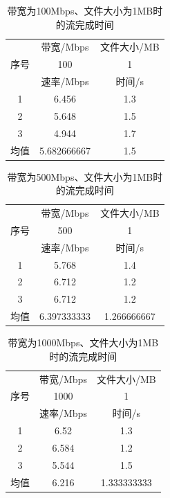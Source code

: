 \documentclass[UTF8]{article}
\begin{document}
\begin{table}[H]
  \centering
  \caption{带宽为100Mbps、文件大小为1MB时的流完成时间}
  \begin{tabular}{|c|c|c|}
    \hline
    \multirow{3}{*}{序号}&带宽/Mbps&文件大小/MB\\
    \cline{2-3}
    &100&1\\
    \cline{2-3}
    &速率/Mbps&时间/s\\
    \hline
    1&6.456&1.3\\
    \hline
    2&5.648&1.5\\
    \hline
    3&4.944&1.7\\
    \hline
    均值&5.682666667&1.5\\
    \hline
  \end{tabular}
\end{table}

\begin{table}[H]
  \centering
  \caption{带宽为500Mbps、文件大小为1MB时的流完成时间}
  \begin{tabular}{|c|c|c|}
    \hline
    \multirow{3}{*}{序号}&带宽/Mbps&文件大小/MB\\
    \cline{2-3}
    &500&1\\
    \cline{2-3}
    &速率/Mbps&时间/s\\
    \hline
    1&5.768&1.4\\
    \hline
    2&6.712&1.2\\
    \hline
    3&6.712&1.2\\
    \hline
    均值&6.397333333&1.266666667\\
    \hline
  \end{tabular}
\end{table}

\begin{table}
  \centering
  \caption{带宽为1000Mbps、文件大小为1MB时的流完成时间}
  \begin{tabular}{|c|c|c|}
    \hline
    \multirow{3}{*}{序号}&带宽/Mbps&文件大小/MB\\
    \cline{2-3}
    &1000&1\\
    \cline{2-3}
    &速率/Mbps&时间/s\\
    \hline
    1&6.52&1.3\\
    \hline
    2&6.584&1.2\\
    \hline
    3&5.544&1.5\\
    \hline
    均值&6.216&1.333333333\\
    \hline
  \end{tabular}
\end{table}
\end{document}
